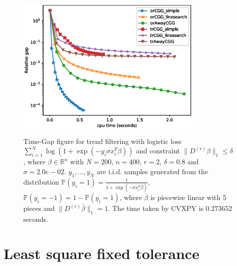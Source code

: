 \documentclass[english]{article}
\newcommand{\R}{\mathbb{R}}
\begin{document}
\begin{figure}[htbp]
	\centering
	\includegraphics[height=7.2cm,width=9cm]{Images/Logistic_Time_vs_RelativeGap_99.eps}
	\caption{Time-Gap figure for trend filtering with logistic loss $\sum_{i=1}^N \log \left( 1+\exp(-y_i\sigma x_i^T \beta) \right)$ and constraint $\|D^{(r)} \beta\|_1 \le \delta$, where $\beta\in \R^n$ with $N= 200$, $n = 400$, $r = 2$, $\delta= 0.8$ and $\sigma= 2.0e-02$. $y_1,...,y_N$ are i.i.d. samples generated from the distribution $\mathbb{P}(y_i = 1) = \frac{1}{1+\exp(-\sigma x_i^T \bar \beta)}, $ $\mathbb{P}(y_i = -1) = 1- \mathbb{P}(y_i = 1)$, where $\bar \beta$ is piecewise linear with 5 pieces and $\|D^{(r)} \bar \beta\|_1 = 1$. The time taken by CVXPY is 0.273652 seconds.}
	\label{Time-Gap99}
\end{figure}




\section{Least square fixed tolerance}
\end{document}
